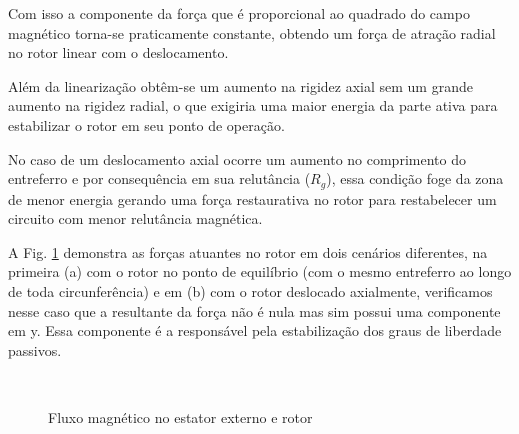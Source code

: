 Com isso a componente da força que é proporcional ao quadrado do campo magnético torna-se praticamente constante, obtendo um força de atração radial no rotor linear com o deslocamento.

Além da linearização obtêm-se um aumento na rigidez axial sem um grande aumento na rigidez radial, o que exigiria uma maior energia da parte ativa para estabilizar o rotor em seu ponto de operação. 

No caso de um deslocamento axial ocorre um aumento no comprimento do entreferro e por consequência em sua relutância ($R_{g}$), essa condição foge da zona de menor energia gerando uma força restaurativa no rotor para restabelecer um circuito com menor relutância magnética.

A Fig. \ref{fig:modelo:circuito:passivo:forcas} demonstra as forças atuantes no rotor em dois cenários diferentes, na primeira (a) com o rotor no ponto de equilíbrio (com o mesmo entreferro ao longo de toda circunferência) e em (b) com o rotor deslocado axialmente, verificamos nesse caso que a resultante da força não é nula mas sim possui uma componente em y. Essa componente é a responsável pela estabilização dos graus de liberdade passivos.

\begin{figure}[th!]
\centering
{} \\
\caption{Fluxo magnético no estator externo e rotor}
\label{fig:modelo:circuito:passivo:forcas}
\end{figure}

